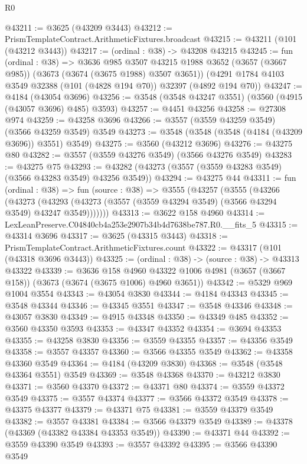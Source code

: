 \begin{lexlean}{R0}
\begin{coremodule}
@43211 := @3625 (@43209 @3443)
@43212 := PrismTemplateContract.ArithmeticFixtures.broadcast
@43215 := @43211 (@101 (@43212 @3443))
@43217 := (ordinal : @38) -> @43208 @43215
@43245 := fun (ordinal : @38) =>
  @3636
    @985
    @3507
    @43215
    @1988
    @3652
    (@3657 (@3667 @985))
    (@3673 (@3674 (@3675 @1988) @3507 @3651))
    (@4291 @1784 @4103 @3549 @32388 (@101 (@4828 @194 @70)) @32397 (@4892 @194 @70))
@43247 := @4184 (@43054 @3696)
@43256 := @3548 (@3548 @43247 @3551) (@3560 (@4915 (@43057 @3696) @485) @3593)
@43257 := @4451 @43256
@43258 := @27308 @974
@43259 := @43258 @3696
@43266 := @3557 (@3559 @43259 @3549) (@3566 @43259 @3549) @3549
@43273 := @3548 (@3548 (@3548 (@4184 (@43209 @3696)) @3551) @3549)
@43275 := @3560 (@43212 @3696)
@43276 := @43275 @80
@43282 := @3557 (@3559 @43276 @3549) (@3566 @43276 @3549)
@43283 := @43275 @75
@43293 := @43282 (@43273 (@3557 (@3559 @43283 @3549) (@3566 @43283 @3549) @43256 @3549))
@43294 := @43275 @44
@43311 := fun (ordinal : @38) =>
  fun (source : @38) =>
  @3555
    (@43257
      (@3555
        (@43266
          (@43273
            (@43293 (@43273 (@3557 (@3559 @43294 @3549) (@3566 @43294 @3549) @43247 @3549)))))))
@43313 := @3622 @158 @4960
@43314 := LexLeanPreserve.C04840cb4a253e2907b34b4d7638be787.R0.__fits_5
@43315 := @43314 @3696
@43317 := @3625 (@43315 @3443)
@43318 := PrismTemplateContract.ArithmeticFixtures.count
@43322 := @43317 (@101 (@43318 @3696 @3443))
@43325 := (ordinal : @38) -> (source : @38) -> @43313 @43322
@43339 := @3636
    @158
    @4960
    @43322
    @1006
    @4981
    (@3657 (@3667 @158))
    (@3673 (@3674 (@3675 @1006) @4960 @3651))
@43342 := @5329 @969 @1004 @3554
@43343 := @43054 @3830
@43344 := @4184 @43343
@43345 := @3548 @43344
@43346 := @43345 @3551
@43347 := @3548 @43346
@43348 := @43057 @3830
@43349 := @4915 @43348
@43350 := @43349 @485
@43352 := @3560 @43350 @3593
@43353 := @43347 @43352
@43354 := @3694 @43353
@43355 := @43258 @3830
@43356 := @3559 @43355
@43357 := @43356 @3549
@43358 := @3557 @43357
@43360 := @3566 @43355 @3549
@43362 := @43358 @43360 @3549
@43364 := @4184 (@43209 @3830)
@43368 := @3548 (@3548 @43364 @3551) @3549
@43369 := @3548 @43368
@43370 := @43212 @3830
@43371 := @3560 @43370
@43372 := @43371 @80
@43374 := @3559 @43372 @3549
@43375 := @3557 @43374
@43377 := @3566 @43372 @3549
@43378 := @43375 @43377
@43379 := @43371 @75
@43381 := @3559 @43379 @3549
@43382 := @3557 @43381
@43384 := @3566 @43379 @3549
@43389 := @43378 (@43369 (@43382 @43384 @43353 @3549))
@43390 := @43371 @44
@43392 := @3559 @43390 @3549
@43393 := @3557 @43392
@43395 := @3566 @43390 @3549

\end{coremodule}
\end{lexlean}
